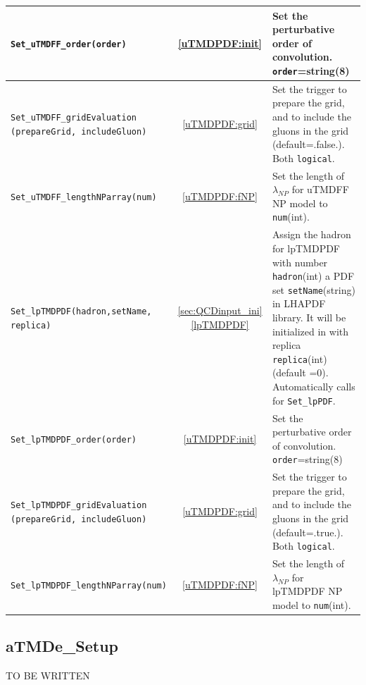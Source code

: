 \documentclass[prd,nofootinbib,eqsecnum,final]{revtex4}
\renewcommand{\(}{\left(}
\renewcommand{\)}{\right)}
\renewcommand{\[}{\left[}
\renewcommand{\]}{\right]}
\newcommand{\red}[1]{{\color[rgb]{1,0,0} #1}}
\newcommand{\blue}[1]{{\color{blue} #1}}
\begin{document}
\begin{center}
\begin{longtable}{||p{7cm}|c|p{10cm}||}
\\\hline
\texttt{Set\_uTMDFF\_order(order)} &\ref{uTMDPDF:init} & Set the perturbative order of convolution. \texttt{order}=string(8)
\\\hline
\texttt{Set\_uTMDFF\_gridEvaluation} \texttt{(prepareGrid,\blue{includeGluon})} & \ref{uTMDPDF:grid} & Set the trigger to prepare the grid, and to include the gluons in the grid (default=.false.). Both \texttt{logical}.
\\\hline
\texttt{Set\_uTMDFF\_lengthNParray(num)} & \ref{uTMDPDF:fNP} & Set the length of $\lambda_{NP}$ for uTMDFF NP model to \texttt{num}(int).
\\\hline\hline
\texttt{Set\_lpTMDPDF(hadron,setName,\blue{replica}) } & \ref{sec:QCDinput_ini} \ref{lpTMDPDF} & Assign the hadron for lpTMDPDF with number \texttt{hadron}(int) a PDF set \texttt{setName}(string) in LHAPDF library. It will be initialized in with replica \texttt{replica}(int)(default =0). Automatically calls for \texttt{Set\_lpPDF}.
\\\hline
\texttt{Set\_lpTMDPDF\_order(order)} &\ref{uTMDPDF:init} & Set the perturbative order of convolution. \texttt{order}=string(8)
\\\hline
\texttt{Set\_lpTMDPDF\_gridEvaluation} \texttt{(prepareGrid,\blue{includeGluon})} & \ref{uTMDPDF:grid} & Set the trigger to prepare the grid, and to include the gluons in the grid (default=.true.). Both \texttt{logical}.
\\\hline
\texttt{Set\_lpTMDPDF\_lengthNParray(num)} & \ref{uTMDPDF:fNP} & Set the length of $\lambda_{NP}$ for lpTMDPDF NP model to \texttt{num}(int).
\end{longtable}
\end{center}

\subsection{aTMDe\_Setup}
\label{sec:aTMDe_Setup}
\red{TO BE WRITTEN}
\end{document}
